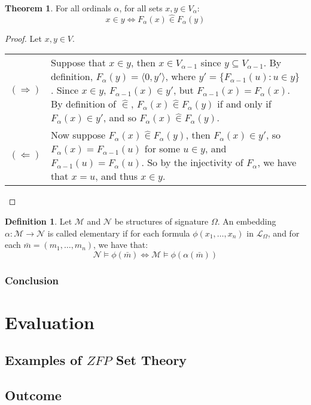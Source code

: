 \documentclass[11pt]{report}
\newcommand{\pair}[2]{\langle #1,#2 \rangle}
\newcommand{\zin}{\mathrel{\widehat{\in}}}
\theoremstyle{definition}
\theoremstyle{theorem}
\theoremstyle{lemma}
\newtheorem{definition}{Definition}[section]
\newtheorem{theorem}{Theorem}[section]
\begin{document}
\begin{theorem} For all ordinals $\alpha$, for all sets $x,y\in V_{\alpha}$:
  $$x\in y \Leftrightarrow F_\alpha(x) \zin F_\alpha(y)$$
\begin{proof} Let $x,y\in V$. \hspace{1mm} \\

  \begin{tabular}{p{7mm} p{144mm}}
    $(\Rightarrow)$ \rule{0pt}{10ex} &
    Suppose that $x\in y$, then $x\in V_{\alpha-1}$ since $y\subseteq V_{\alpha-1}$.
    By definition, $F_\alpha(y) = \pair{0}{y'}$, where $y' = \{F_{\alpha-1}(u) : u\in y\}$.
    Since $x\in y$, $F_{\alpha-1}(x)\in y'$, but $F_{\alpha-1}(x)=F_\alpha(x)$.
    By definition of $\zin$, $F_{\alpha}(x)\zin F_\alpha(y)$ if and only if $F_\alpha(x) \in y'$, and so $F_\alpha(x) \zin F_\alpha(y)$.
    \\

    $(\Leftarrow)$ &
    Now suppose $F_\alpha(x) \zin F_\alpha(y)$, then $F_\alpha(x) \in y'$, so $F_\alpha(x) = F_{\alpha-1}(u)$ for some $u\in y$, and $F_{\alpha-1}(u) = F_{\alpha}(u)$.
    So by the injectivity of $F_\alpha$, we have that $x=u$, and thus $x\in y$.
  \end{tabular}
\end{proof}
\end{theorem}

\begin{definition} Let $\mathcal{M}$ and $\mathcal{N}$ be structures of signature $\Omega$.
An embedding $\alpha: \mathcal{M} \to \mathcal{N}$ is called elementary if for each formula $\phi(x_1,\ldots,x_n)$ in $\mathcal{L}_\Omega$, and for each $\bar{m} = (m_1,\ldots,m_n)$, we have that:
$$\mathcal N \vDash \phi(\bar m) \Leftrightarrow \mathcal M \vDash \phi(\alpha(\bar m))$$
\end{definition}
\subsection{Conclusion}

\chapter{Evaluation}
\section{Examples of $\mathit{ZFP}$ Set Theory}\label{zfpexamples}
\section{Outcome}
\end{document}
